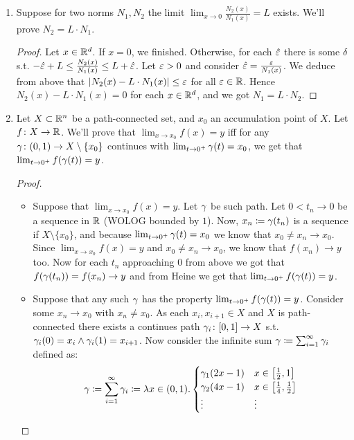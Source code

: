 \documentclass[a4paper]{article}
\begin{document}
	\begin{enumerate}
		\item Suppose for two norms $N_1, N_2$ the limit $\lim_{x \to 0}\frac{N_2(x)}{N_1(x)} = L$ exists. We'll prove $N_2 = L \cdot N_1$. 
		\begin{proof}
			Let $x \in \mathbb{R}^{d}$. If $x = 0$, we finished. Otherwise, for each $\hat \eg$ there is some $\delta$ s.t. $-\hat\eg + L \le \frac{N_2(x)}{N_1(x)} \le L + \hat\eg$. Let $\eg > 0$ and consider $\hat \eg = \frac{\eg}{N_1(x)}$. We deduce from above that $\sof{N_2(x) - L\cdot N_1(x)} \le \eg$ for all $\eg \in \R$. Hence $N_2(x) - L \cdot N_1(x) = 0$ for each $x \in \mathbb{R}^{d}$, and we got $N_1 = L \cdot N_2$. 
		\end{proof}
		
		\item Let $X \subset \mathbb{R}^{n}$ be a path-connected set, and $x_0$ an accumulation point of $X$. Let $f \colon X \to \mathbb{R}$. We'll prove that $\lim_{x \to x_0}f(x) = y$ iff for any $\gamma \colon (0, 1) \to X \setminus \{x_0\}$ continues with $\lim_{t \to 0^{+}}\gamma(t) = x_0$, we get that $\lim_{t \to 0^{+}}f(\gamma(t)) = y$. \begin{proof}
			\begin{itemize}
				\item[$\implies$]Suppose that $\lim_{x \to x_0}f(x) = y$. Let $\gamma$ be such path. Let $0 < t_n \to 0$ be a sequence in $\mathbb{R}$ (WOLOG bounded by $1$). Now, $x_n \coloneqq \gamma(t_n)$ is a sequence if $X \setminus \{x_0\}$, and because $\lim_{t \to 0^{+}} \gamma(t) = x_0$ we know that $x_0 \neq x_n \to x_0$. Since $\lim_{x \to x_0}f(x) = y$ and $x_0 \neq x_n \to x_0$, we know that $f(x_n) \to y$ too. Now for each $t_n$ approaching $0$ from above we got that $f(\gamma(t_n)) = f(x_n) \to y$ and from Heine we get that $\lim_{t \to 0^{+}}f(\gamma(t)) = y$. 
				\item[$\impliedby$]Suppose that any such $\gamma$ has the property $\lim_{t \to 0^{+}}f(\gamma(t)) = y$. Consider some $x_n \to x_0$ with $x_n \neq x_0$. As each $x_i, x_{i + 1} \in X$ and $X$ is path-connected there exists a continues path $\gamma_i \colon [0, 1] \to X$ s.t. $\gamma_i(0) = x_i \land \gamma_i(1) = x_{i + 1}$. Now consider the infinite sum $\gamma \coloneqq \sum_{i = 1}^{\infty}\gamma_i$ defined as: 
				\[ \gamma \coloneqq \sum_{i = 1}^{\infty}\gamma_i \coloneqq \lambda x \in (0, 1). \begin{cases}
					\gamma_1(2x - 1) & x \in \left [ \frac{1}{2}, 1 \right ] \\
					\gamma_2(4x - 1) & x \in \left [ \frac{1}{4}, \frac{1}{2} \right ] \\
					\vdots & \vdots \\

\end{cases}\]
\end{itemize}
\end{proof}
\end{enumerate}
\end{document}
